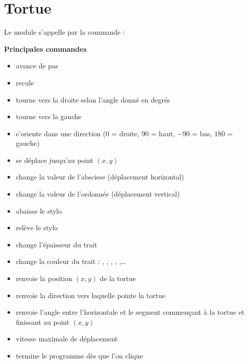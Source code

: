 \documentclass[11pt,class=report,crop=false]{standalone}
\begin{document}
\section{Tortue}

Le module  s'appelle par la commande :\\
\centerline{}

\bigskip

\textbf{Principales commandes}
\begin{itemize}
  \item {} \quad avance de  pas
  \item {} \quad recule
  \item {} \quad tourne vers la droite selon l'angle donné en degrés
  \item {} \quad tourne vers la gauche
  \item {} \quad s'oriente dans une direction ($0$ = droite, $90$ = haut, $-90$ = bas, $180$ = gauche)
  \item {} \quad se déplace jusqu'au point $(x,y)$
  \item {} \quad change la valeur de l'abscisse (déplacement horizontal)
  \item {} \quad change la valeur de l'ordonnée (déplacement vertical)
  
  
  \item {} \quad abaisse le stylo
  \item {} \quad relève le stylo
  \item {} \quad change l'épaisseur du trait
  \item {} \quad change la couleur du trait : , , , , ,\ldots
  
  \item {}  \quad renvoie la position $(x,y)$ de la tortue
  \item {} \quad renvoie la direction  vers laquelle pointe la tortue
  \item {} \quad renvoie l'angle entre l'horizontale et le segment commençant à la tortue et finissant au point $(x,y)$
  \item {} \quad vitesse maximale de déplacement
  \item {} \quad termine le programme dès que l'on clique
\end{itemize}
\end{document}
